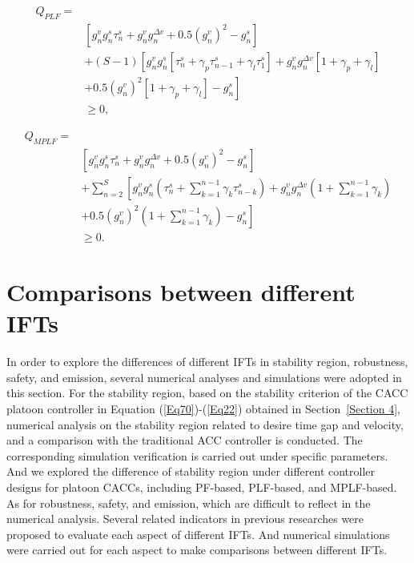 \documentclass[journal]{IEEEtran}
\begin{document}
\begin{equation}
  \begin{aligned}
    Q_{PLF}=\\
    &\left[ g_{n}^{v} g_{n}^{s} \tau_{n}^{s} \!+\!g_{n}^{v} g_{n}^{\Delta v}+0.5\left(g_{n}^{v}\right)^{2}\!-\!g_{n}^{s} \right]\\
    &+\left(S\!-\!1\right)\left[g_{n}^{v} g_{n}^{s}\left[\tau_{n}^{s}\!+\!\gamma_{p} \tau_{n\!-\!1}^{s}\!+\!\gamma_{l} \tau_{1}^{s}\right]\!+\!g_{n}^{v} g_{n}^{\Delta v}\left[1\!+\!\gamma_{p}\!+\!\gamma_{l}\right] \right.\\
    & \left.+0.5\left(g_{n}^{v}\right)^{2}\left[1\!+\!\gamma_{p}\!+\!\gamma_{l}\right]\!-\!g_{n}^{s} \right]\\
    &\geq 0,
  \end{aligned}
  \label{Eq72}
  \end{equation}

\begin{equation}
  \begin{aligned}
    Q_{MPLF}=\\
    &\left[ g_{n}^{v} g_{n}^{s} \tau_{n}^{s} \!+\!g_{n}^{v} g_{n}^{\Delta v}+0.5\left(g_{n}^{v}\right)^{2}\!-\!g_{n}^{s} \right]\\
    &+\sum_{n=2}^{S} \left[g_{n}^{v} g_{n}^{s}\left(\tau_{n}^{s}\!+\!\sum_{k=1}^{n\!-\!1} \gamma_{k} \tau_{n\!-\!k}^{s}\right)\!+\!g_{n}^{v} g_{n}^{\Delta v}\left(1\!+\!\sum_{k=1}^{n\!-\!1} \gamma_{k}\right)\right.\\
    &+\left.0.5\left(g_{n}^{v}\right)^{2}\left(1\!+\!\sum_{k=1}^{n\!-\!1} \gamma_{k}\right)\!-\!g_{n}^{s} \right]\\
    &\geq 0.
  \end{aligned}
  \label{Eq73}
  \end{equation}



\section{Comparisons between different IFTs}
\label{Section 5}
In order to explore the differences of different IFTs in stability region, robustness, safety, and emission, several numerical analyses and simulations were adopted in this section. For the stability region, based on the stability criterion of the CACC platoon controller in Equation (\ref{Eq70})-(\ref{Eq22}) obtained in Section~\ref{Section 4}, numerical analysis on the stability region related to desire time gap and velocity, and a comparison with the traditional ACC controller is conducted. The corresponding simulation verification is carried out under specific parameters. And we explored the difference of stability region under different controller designs for platoon CACCs, including PF-based, PLF-based, and MPLF-based. As for robustness, safety, and emission, which are difficult to reflect in the numerical analysis. Several related indicators in previous researches were proposed to evaluate each aspect of different IFTs. And numerical simulations were carried out for each aspect to make comparisons between different IFTs.
\end{document}
